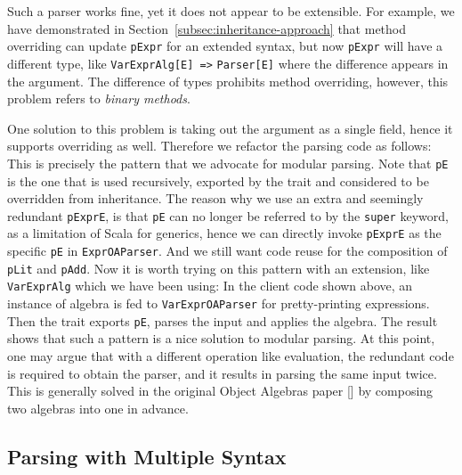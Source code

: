 Such a parser works fine, yet it does not appear to be extensible. For example, we have demonstrated in Section~\ref{subsec:inheritance-approach} that method overriding can update \lstinline{pExpr} for an extended syntax, but now \lstinline{pExpr} will have a different type, like \lstinline{VarExprAlg[E] =>} \lstinline{Parser[E]} where the difference appears in the argument. The difference of types prohibits method overriding, however, this problem refers to \textit{binary methods}. 

One solution to this problem is taking out the argument as a single field, hence it supports overriding as well. Therefore we refactor the parsing code as follows:
This is precisely the pattern that we advocate for modular parsing. Note that \lstinline{pE} is the one that is used recursively, exported by the trait and considered to be overridden from inheritance. The reason why we use an extra and seemingly redundant \lstinline{pExprE}, is that \lstinline{pE} can no longer be referred to by the \lstinline{super} keyword, as a limitation of Scala for generics, hence we can directly invoke \lstinline{pExprE} as the specific \lstinline{pE} in \lstinline{ExprOAParser}. And we still want code reuse for the composition of \lstinline{pLit} and \lstinline{pAdd}. Now it is worth trying on this pattern with an extension, like \lstinline{VarExprAlg} which we have been using:
In the client code shown above, an instance of algebra is fed to \lstinline{VarExprOAParser} for pretty-printing expressions. Then the trait exports \lstinline{pE}, parses the input and applies the algebra. The result shows that such a pattern is a nice solution to modular parsing. At this point, one may argue that with a different operation like evaluation, the redundant code is required to obtain the parser, and it results in parsing the same input twice. This is generally solved in the original Object Algebras paper [] by composing two algebras into one in advance.

\subsection{Parsing with Multiple Syntax}\label{subsec:differentsyntax}

